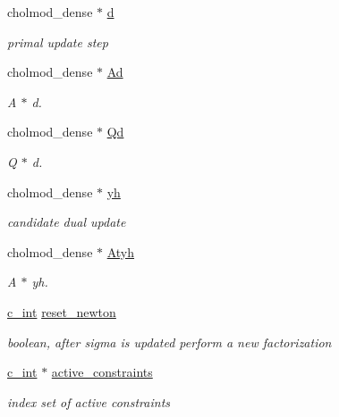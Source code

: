 \begin{DoxyCompactItemize}
cholmod\+\_\+dense $\ast$ \mbox{\hyperlink{structQPALMCholmod_ad0aa804eb45d8ec35a7f5bc7cb8ad3d8}{d}}
\begin{DoxyCompactList}\small\item\em primal update step \end{DoxyCompactList}\item 
cholmod\+\_\+dense $\ast$ \mbox{\hyperlink{structQPALMCholmod_a56224cbea98a1f5555eb08701b1e97d5}{Ad}}
\begin{DoxyCompactList}\small\item\em A $\ast$ d. \end{DoxyCompactList}\item 
cholmod\+\_\+dense $\ast$ \mbox{\hyperlink{structQPALMCholmod_abaedb802a939e9ee04577c87bb9f25cc}{Qd}}
\begin{DoxyCompactList}\small\item\em Q $\ast$ d. \end{DoxyCompactList}\item 
cholmod\+\_\+dense $\ast$ \mbox{\hyperlink{structQPALMCholmod_afec81875b9a1a98a6984d0b607cdd28e}{yh}}
\begin{DoxyCompactList}\small\item\em candidate dual update \end{DoxyCompactList}\item 
cholmod\+\_\+dense $\ast$ \mbox{\hyperlink{structQPALMCholmod_a94defa21b4eb5bc4e49bd344e72f8174}{Atyh}}
\begin{DoxyCompactList}\small\item\em A\textquotesingle{} $\ast$ yh. \end{DoxyCompactList}\item 
\mbox{\hyperlink{global__opts_8h_aa3217a0f49d3e52b74e9dd830c44472f}{c\+\_\+int}} \mbox{\hyperlink{structQPALMCholmod_a5d243ea350665531164a8b355ac7c370}{reset\+\_\+newton}}
\begin{DoxyCompactList}\small\item\em boolean, after sigma is updated perform a new factorization \end{DoxyCompactList}\item 
\mbox{\hyperlink{global__opts_8h_aa3217a0f49d3e52b74e9dd830c44472f}{c\+\_\+int}} $\ast$ \mbox{\hyperlink{structQPALMCholmod_a90e849ad034aa9c44fdb05b4a28f4d94}{active\+\_\+constraints}}
\begin{DoxyCompactList}\small\item\em index set of active constraints \end{DoxyCompactList}\item 

\end{DoxyCompactItemize}
